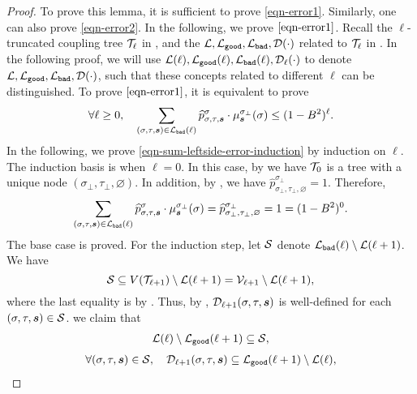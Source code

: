 \documentclass[11pt]{article}
\def\!#1{\mathtt{#1}}
\newcommand{\seqS}{\boldsymbol{s}}
\begin{document}
\begin{proof}
To prove this lemma, it is sufficient to prove \eqref{eqn-error1}.
Similarly, one can also prove \eqref{eqn-error2}.
In the following, we prove $\eqref{eqn-error1}$.
Recall the $\ell$-truncated coupling tree $\mathcal{T}_{\ell}$ in , 
and the $\+L,\+L_{\!{good}},\+L_{\!{bad}},\+D(\cdot)$ related to $\mathcal{T}_{\ell}$ in .
In the following proof, we will use $\+L(\ell),\+L_{\!{good}}(\ell),\+L_{\!{bad}}(\ell),\+D_{\ell}(\cdot)$ to denote $\+L,\+L_{\!{good}},\+L_{\!{bad}},\+D(\cdot)$, such that
these concepts related to different $\ell$ can be distinguished.
To prove $\eqref{eqn-error1}$,
it is equivalent to prove
\begin{align}\label{eqn-sum-leftside-error-induction}
    \forall \ell\geq 0, \quad \sum_{(\sigma,\tau, \seqS)\in \+L_{\!{bad}}(\ell)} \widehat{p}^{\sigma}_{\sigma,\tau,\seqS} \cdot \mu^{\sigma_{\bot}}_{\seqS}(\sigma)\leq (1 - B^2)^{\ell}.
\end{align}
In the following, we prove \eqref{eqn-sum-leftside-error-induction} by induction on $\ell$.
The induction basis is when $\ell = 0$.
In this case, by  we have $\mathcal{T}_{0}$ is a tree with a unique node $(\sigma_\bot, \tau_\bot, \varnothing)$.
In addition, by , we have 
$\widehat{p}^{\sigma_\bot}_{\sigma_\bot,\tau_\bot, \varnothing} = 1$.
Therefore, 
 \begin{align*}
    \sum_{(\sigma,\tau, \seqS)\in \+L_{\!{bad}}(\ell)} \widehat{p}^{\sigma}_{\sigma,\tau,\seqS}\cdot\mu^{\sigma_{\bot}}_{\seqS}(\sigma)=\widehat{p}^{\sigma_\bot}_{\sigma_\bot,\tau_\bot, \varnothing} = 1 = (1- B^2)^{0}.
\end{align*}
The base case is proved. For the induction step, 
let $\mathcal{S}$ denote $\+L_{\!{bad}}(\ell)\setminus \+L(\ell+1)$.
We have 
\[\mathcal{S} \subseteq V(\mathcal{T}_{\ell+1})\setminus \mathcal{L}(\ell+1)= \mathcal{V}_{\ell+1}\setminus \mathcal{L}(\ell+1),\]
where the last equality is by .
Thus, by , 
$\+D_{\ell+1}(\sigma,\tau,\seqS)$ is well-defined for each $(\sigma,\tau,\seqS)\in \+S$.
we claim that 
\begin{align}\label{eq-d-subset-1}
\+L(\ell)\setminus \+L_{\!{good}}(\ell+1) \subseteq \+S,
\end{align}
\begin{align}\label{eq-d-subset-2}
\forall (\sigma,\tau,\seqS)\in \+S, \quad \+D_{\ell+1}(\sigma,\tau,\seqS)\subseteq \+L_{\!{good}}(\ell+1)\setminus \+L(\ell),
\end{align}

\end{proof}
\end{document}
